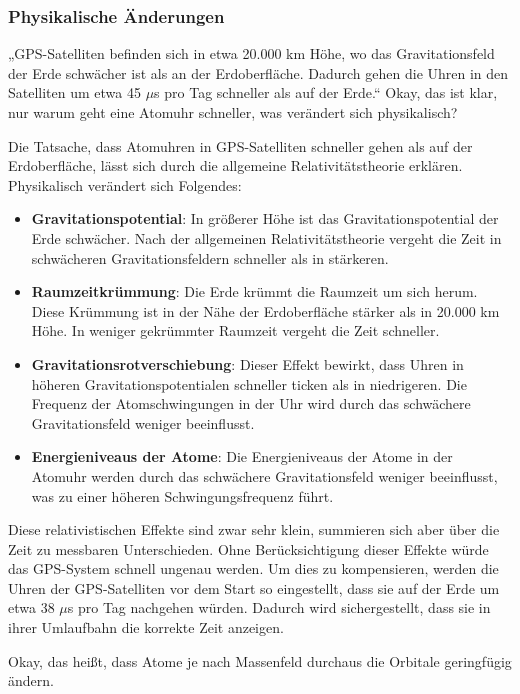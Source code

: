 \documentclass[a4paper,12pt]{article}
\begin{document}
	\subsubsection{Physikalische Änderungen}
	„GPS-Satelliten befinden sich in etwa 20.000 km Höhe, wo das Gravitationsfeld der Erde schwächer ist als an der Erdoberfläche. Dadurch gehen die Uhren in den Satelliten um etwa 45 $\mu$s pro Tag schneller als auf der Erde.“ Okay, das ist klar, nur warum geht eine Atomuhr schneller, was verändert sich physikalisch?
	
	Die Tatsache, dass Atomuhren in GPS-Satelliten schneller gehen als auf der Erdoberfläche, lässt sich durch die allgemeine Relativitätstheorie erklären. Physikalisch verändert sich Folgendes:
	\begin{itemize}
		\item \textbf{Gravitationspotential}: In größerer Höhe ist das Gravitationspotential der Erde schwächer. Nach der allgemeinen Relativitätstheorie vergeht die Zeit in schwächeren Gravitationsfeldern schneller als in stärkeren.
		\item \textbf{Raumzeitkrümmung}: Die Erde krümmt die Raumzeit um sich herum. Diese Krümmung ist in der Nähe der Erdoberfläche stärker als in 20.000 km Höhe. In weniger gekrümmter Raumzeit vergeht die Zeit schneller.
		\item \textbf{Gravitationsrotverschiebung}: Dieser Effekt bewirkt, dass Uhren in höheren Gravitationspotentialen schneller ticken als in niedrigeren. Die Frequenz der Atomschwingungen in der Uhr wird durch das schwächere Gravitationsfeld weniger beeinflusst.
		\item \textbf{Energieniveaus der Atome}: Die Energieniveaus der Atome in der Atomuhr werden durch das schwächere Gravitationsfeld weniger beeinflusst, was zu einer höheren Schwingungsfrequenz führt.
	\end{itemize}
	Diese relativistischen Effekte sind zwar sehr klein, summieren sich aber über die Zeit zu messbaren Unterschieden. Ohne Berücksichtigung dieser Effekte würde das GPS-System schnell ungenau werden. Um dies zu kompensieren, werden die Uhren der GPS-Satelliten vor dem Start so eingestellt, dass sie auf der Erde um etwa 38 $\mu$s pro Tag nachgehen würden. Dadurch wird sichergestellt, dass sie in ihrer Umlaufbahn die korrekte Zeit anzeigen.
	
	Okay, das heißt, dass Atome je nach Massenfeld durchaus die Orbitale geringfügig ändern.
	
\end{document}

